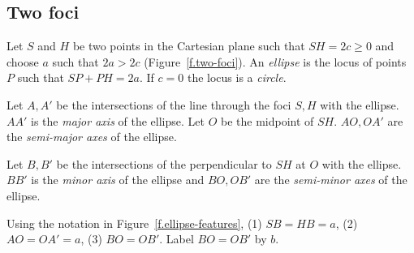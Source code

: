 \subsection*{Two foci}
\begin{definition}\label{def.two-foci}
Let $S$ and $H$ be two points in the Cartesian plane such that $SH=2c\geq 0$ and choose $a$ such that $2a> 2c$ (Figure~\ref{f.two-foci}). An \emph{ellipse} is the locus of points $P$ such that $SP+PH=2a$. If $c=0$ the locus is a \emph{circle}.
\end{definition}
\begin{definition}\label{def.features}
Let $A,A'$ be the intersections of the line through the foci $S,H$ with the ellipse. $AA'$ is the \emph{major axis} of the ellipse. Let $O$ be the midpoint of $SH$. $AO,OA'$ are the \emph{semi-major axes} of the ellipse.

Let $B,B'$ be the intersections of the perpendicular to $SH$ at $O$ with the ellipse. $BB'$ is the \emph{minor axis} of the ellipse and $BO,OB'$ are the \emph{semi-minor axes} of the ellipse.
\end{definition}
\begin{theorem}\label{thm.ellipses-features}
Using the notation in Figure~\ref{f.ellipse-features}, (1) $SB=HB=a$, (2) $AO=OA'=a$, (3) $BO=OB'$. Label $BO=OB'$ by $b$.
\end{theorem}


